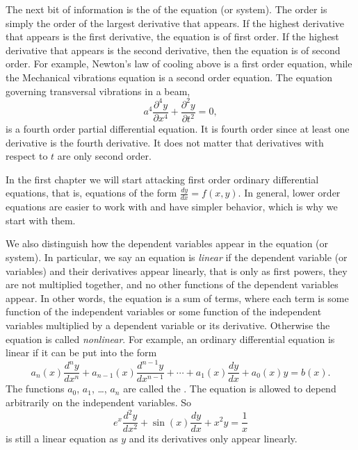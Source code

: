 \documentclass[12pt]{book}
\begin{document}
\medskip

The next bit of information is the \emph{} of the
equation (or system).  The order is simply the order of the largest
derivative that appears.  If the highest derivative that appears is
the first derivative, the equation is of first order.  If the highest
derivative that appears is the second derivative, then the equation is of second
order.  For example, Newton's law of cooling above is a first order
equation, while the Mechanical vibrations equation is a second order equation.
The equation governing transversal vibrations in a beam,
\begin{equation*}
a^4 \frac{\partial^4 y}{\partial x^4} + \frac{\partial^2 y}{\partial t^2} = 0,
\end{equation*}
is a fourth order partial differential equation.  It is
fourth order since at least one derivative is the fourth derivative.  It
does not matter that derivatives with respect to $t$ are only second order.

In the first chapter we will start attacking first order ordinary
differential equations, that is, equations of the form $\frac{dy}{dx} = f(x,y)$.
In general, lower order equations are easier to work with and have simpler
behavior, which is why we start with them.

\medskip

We also distinguish how the dependent variables appear in the equation (or
system).  In particular, we say an equation is
\emph{linear} if the
dependent variable (or variables) and their derivatives appear linearly,
that is only as first powers, they are not multiplied together, and no other functions of the dependent
variables appear.  In other words, the equation is a sum of terms,
where each term is
some function of the independent variables
or 
some function of the independent variables
multiplied by a dependent variable
or its derivative.
Otherwise the equation is called
\emph{nonlinear}.
For example,
an ordinary differential equation is linear if it can be
put into the form
\begin{equation} \label{classification:eqlingen}
a_n(x) \frac{d^n y}{dx^n} + 
a_{n-1}(x) \frac{d^{n-1} y}{dx^{n-1}} + 
\cdots
+
a_{1}(x) \frac{dy}{dx}
+
a_{0}(x) y = b(x) .
\end{equation}
The functions $a_0$, $a_1$, \ldots, $a_n$ are called the
\emph{}.
The equation is allowed to depend arbitrarily on the independent variables.
So 
\begin{equation} \label{classification:eqlinex}
e^x \frac{d^2 y}{dx^2} + 
\sin(x) \frac{d y}{dx} + 
x^2 y
=
\frac{1}{x}
\end{equation}
is still a linear equation as $y$ and its derivatives only appear linearly.
\end{document}
